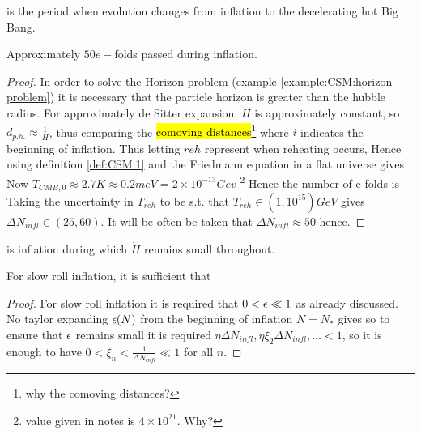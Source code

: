 \documentclass{article}
\begin{document}
\begin{definition}[Reheating]
 is the period when evolution changes from inflation to the decelerating hot Big Bang. 
\end{definition}

\begin{prop}
Approximately $50 e-$folds passed during inflation. 
\end{prop}
\begin{proof}
In order to solve the Horizon problem (example \ref{example:CSM:horizon problem}) it is necessary that the particle horizon is greater than the hubble radius. For approximately de Sitter expansion, $H$ is approximately constant, so $d_{p.h.}\approx \frac{1}{H}$, thus comparing the \hl{comoving distances}\footnote{why the comoving distances?} 
where $i$ indicates the beginning of inflation. Thus letting $reh$ represent when reheating occurs, 
Hence using definition \ref{def:CSM:1} and the Friedmann equation in a flat universe 
gives 
Now $T_{CMB,0} \approx 2.7K \approx 0.2 meV = 2 \times 10^{-13} Gev $
\footnote{value given in notes is $4\times 10^{21}$. Why?}
Hence the number of e-folds is 
Taking the uncertainty in $T_{reh}$ to be s.t. that $T_{reh} \in (1,10^{15}) GeV$ gives $\Delta N_{infl} \in (25,60)$. It will be often be taken that $\Delta N_{infl} \approx 50$ hence. 
\end{proof}

\begin{definition}
 is inflation during which $\dot{H}$ remains small throughout.
\end{definition}

\begin{prop}
For slow roll inflation, it is sufficient that 
\end{prop}
\begin{proof}
For slow roll inflation it is required that $0 < \epsilon \ll 1$ as already discussed. No taylor expanding $\epsilon(N)$ from the beginning of inflation $N=N_\ast$ gives 
so to ensure that $\epsilon$ remains small it is required $\eta \Delta N_{infl}, \eta \xi_2 \Delta N_{infl}, \dots < 1$, so it is enough to have $0<\xi_n < \frac{1}{\Delta N_{infl}} \ll 1$ for all $n$. 
\end{proof}
\end{document}
